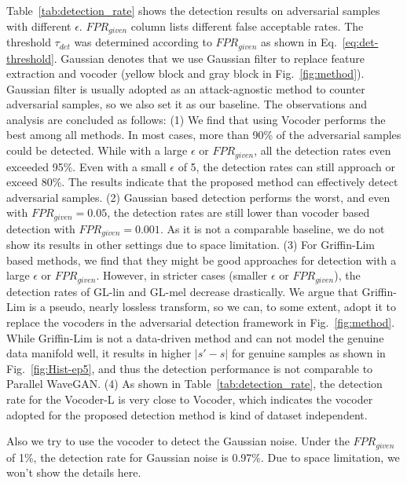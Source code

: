 Table~\ref{tab:detection_rate} shows the detection results on adversarial samples with different $\epsilon$.
$FPR_{given}$ column lists different false acceptable rates.
The threshold $\tau_{det}$ was determined according to $FPR_{given}$ as shown in Eq.~\ref{eq:det-threshold}.
Gaussian denotes that we use Gaussian filter to replace feature extraction and vocoder (yellow block and gray block in Fig.~\ref{fig:method}).
Gaussian filter \cite{wu2020defense,wu2021adversarialasv} is usually adopted as an attack-agnostic method to counter adversarial samples, so we also set it as our baseline.
The observations and analysis are concluded as follows:
(1) We find that using Vocoder performs the best among all methods.
In most cases, more than 90\% of the adversarial samples could be detected. While with a large $\epsilon$ or $FPR_{given}$, all the detection rates even exceeded 95\%.
Even with a small $\epsilon$ of 5, the detection rates can still approach or exceed 80\%.
The results indicate that the proposed method can effectively detect adversarial samples.
(2) Gaussian based detection performs the worst, and even with $FPR_{given}=0.05$, the detection rates are still lower than vocoder based detection with $FPR_{given}=0.001$.
As it is not a comparable baseline, we do not show its results in other settings due to space limitation.
(3) For Griffin-Lim based methods, we find that they might be good approaches for detection with a large $\epsilon$ or $FPR_{given}$.
However, in stricter cases (smaller $\epsilon$ or $FPR_{given}$), the detection rates of GL-lin and GL-mel decrease drastically.
We argue that Griffin-Lim is a pseudo, nearly lossless transform, so we can, to some extent, adopt it to replace the vocoders in the adversarial detection framework in Fig.~\ref{fig:method}. 
While Griffin-Lim is not a data-driven method and can not model the genuine data manifold well, it results in higher $|s'-s|$ for genuine samples as shown in Fig.~\ref{fig:Hist-ep5}, and thus the detection performance is not comparable to Parallel WaveGAN.
(4) As shown in Table~\ref{tab:detection_rate}, the detection rate for the Vocoder-L is very close to Vocoder, which indicates the vocoder adopted for the proposed detection method is kind of dataset independent.

Also we try to use the vocoder to detect the Gaussian noise. 
Under the $FPR_{given}$ of 1\%, the detection rate for Gaussian noise is 0.97\%.
Due to space limitation, we won't show the details here.